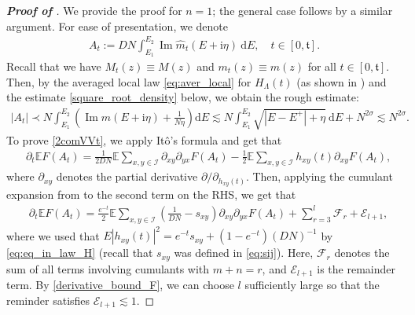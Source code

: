 \documentclass[10pt,reqno]{amsart}
\numberwithin{equation}{section}
\numberwithin{figure}{section}
\theoremstyle{plain} %
\theoremstyle{definition} %
\newcommand{\cal}{\mathcal}
\newcommand{\wh}{\widehat}
\newcommand{\E}{\mathbb{E}}
\newcommand{\cI}{\mathcal{I}}
\newcommand{\ft}{{\mathfrak t}}
\newcommand{\ii}{\mathrm{i}}
\newcommand{\pa}[1]{\left({#1}\right)}
\newcommand{\qa}[1]{\left[{#1}\right]}
\newcommand{\absa}[1]{\left\lvert #1 \right\rvert}
\DeclareMathOperator{\im}{\mathrm{Im}}
\newcommand{\rd}{\mathrm{d}}
\numberwithin{equation}{section}
\begin{document}
\begin{proof}[\bf Proof of ]
We provide the proof for $n=1$; the general case follows by a similar argument. For ease of presentation, we denote 
\begin{equation}\nonumber
    \begin{aligned}
        A_t:=DN \int_{E_1}^{E_2}  \operatorname{Im} \wh m_{t}(E+\ii \eta)\mathrm{~d} E ,\quad t\in \qa{0,\ft}.
    \end{aligned}
\end{equation}
Recall that we have $M_t(z)\equiv M(z)$ and $m_t(z)\equiv m(z)$ for all $t\in\qa{0,\ft}$. Then, by the averaged local law \eqref{eq:aver_local} for $H_\Lambda\pa{t}$ (as shown in ) and the estimate \eqref{square_root_density} below, we obtain the rough estimate: 
\begin{equation}\label{rough_estimate_A_t}
    \begin{aligned}
        \absa{A_t}\prec N \int_{E_1}^{E_2} \pa{\im m\pa{E+\ii \eta}+\frac{1}{N\eta}} \rd E\lesssim N \int_{E_1}^{E_2}\sqrt{\absa{E-E^+}+\eta}\ \rd E+N^{2\sigma}\lesssim N^{2\sigma}.
    \end{aligned}
\end{equation}
To prove \eqref{2comVVt}, we apply It{\^o}'s formula and get that 
\begin{align*}
    &\partial_{t}\E  F\pa{A_t}  = \frac{1}{2DN}\E\sum_{x,y\in \cI} \partial_{xy}\partial_{yx}F\pa{ A_t} - \frac{1}{2}\E\sum_{x,y\in \cI} h_{xy}(t)\partial_{xy}F\pa{ A_t},
\end{align*}
where $\partial_{xy}$ denotes the partial derivative $\partial/\partial_{h_{xy}(t)}$. Then, applying the cumulant expansion from  to the second term on the RHS, we get that 
\begin{align}\label{eq:prodnGt}
    &\partial_{t}\E F\pa{ A_t}  = \frac{e^{-t}}{2}\E\sum_{x,y\in \cI} \left( \frac{1}{DN} - s_{xy}\right)\partial_{xy}\partial_{yx} F\pa{A_t} + \sum_{r=3}^l \cal F_r + \cal E_{l+1} ,
\end{align}
where we used that $E|h_{xy}(t)|^2=e^{-t}s_{xy}+(1-e^{-t})(DN)^{-1}$ by \eqref{eq:eq_in_law_H} (recall that $s_{xy}$ was defined in \eqref{eq:sij}). Here, $\cal F_r$ denotes the sum of all terms involving cumulants \smash{$\cal C^{(m,n)}(h_{xy}(t))$} with $m+n=r$, and $\cal E_{l+1}$ is the remainder term. By \eqref{derivative_bound_F}, we can choose $l$ sufficiently large so that the reminder satisfies $ \cal E_{l+1} \lesssim 1$. 


\end{proof}
\end{document}
